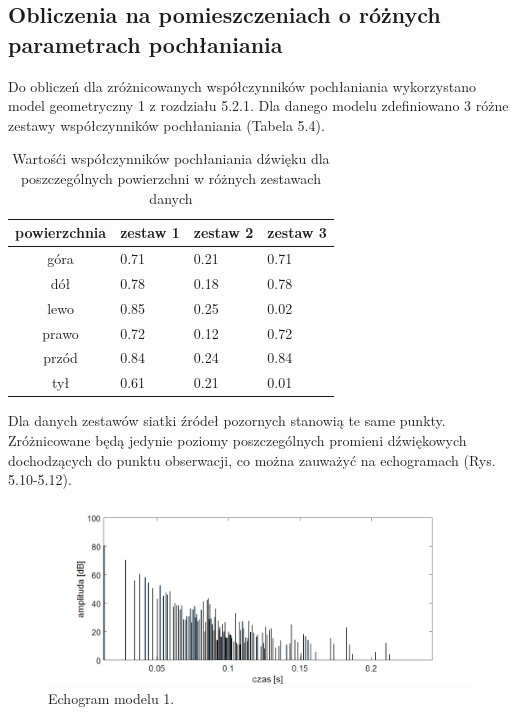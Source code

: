 
\subsection{Obliczenia na pomieszczeniach o różnych parametrach pochłaniania}\label{sec:imstest2}

Do obliczeń dla zróżnicowanych współczynników pochłaniania wykorzystano model geometryczny 1 z rozdziału 5.2.1. Dla danego modelu zdefiniowano 3 różne zestawy współczynników pochłaniania (Tabela 5.4).

\begin{table}[h]
        \centering
        \begin{threeparttable}
                \caption{Wartośći współczynników pochłaniania dźwięku dla poszczególnych powierzchni w różnych zestawach danych}\label{tab:table_example}
                \begin{tabularx}{0.6\textwidth}{| c | X | X | X |}
                        \toprule
                        	powierzchnia &	zestaw 1 & zestaw 2 & zestaw 3 \\
                       \midrule
		góra & 0.71 & 0.21 & 0.71 \\
                        dół & 0.78 & 0.18 & 0.78 \\
		lewo & 0.85 & 0.25 & 0.02 \\
                     prawo & 0.72 & 0.12 & 0.72 \\
		przód & 0.84 & 0.24 & 0.84 \\
                    tył & 0.61 & 0.21 & 0.01 \\
                        \bottomrule
                \end{tabularx}
        \end{threeparttable}
\end{table}

Dla danych zestawów siatki źródeł pozornych stanowią te same punkty. Zróżnicowane będą jedynie poziomy poszczególnych promieni dźwiękowych dochodzących do punktu obserwacji, co można zauważyć na echogramach (Rys. 5.10-5.12).

\begin{figure}[h]
        \centering
                \centering
                \includegraphics[width=16cm]{echoz1}
	\caption{Echogram modelu 1.}
\end{figure}

